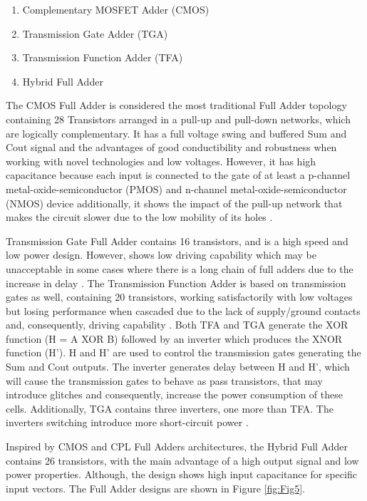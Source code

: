 \documentclass[ecp,tc, english]{iiufrgs}
\begin{document}
\begin{enumerate}
    \item Complementary MOSFET Adder (CMOS)
    \item Transmission Gate Adder (TGA)
    \item Transmission Function Adder (TFA)
    \item Hybrid Full Adder
\end{enumerate}

The CMOS Full Adder is considered the most traditional Full Adder topology containing 28 Transistors arranged in a pull-up and pull-down networks, which are logically complementary. It has a full voltage swing and buffered Sum and Cout signal and the advantages of good conductibility and robustness when working with novel technologies and low voltages. However, it has high capacitance because each input is connected to the gate of at least a p-channel metal-oxide-semiconductor (PMOS) and n-channel metal-oxide-semiconductor (NMOS) device additionally, it shows the impact of the pull-up network that makes the circuit slower due to the low mobility of its holes \cite{beckett2002fine} \cite{devadas2017design} \cite{islam2011design}. 

Transmission Gate Full Adder \cite{weste1985principles} contains 16 transistors, and is a high speed and low power design. However, shows low driving capability which may be unacceptable in some cases where there is a long chain of full adders due to the increase in delay \cite{islam2011design}. The Transmission Function Adder is based on transmission gates as well, containing 20 transistors, working satisfactorily with low voltages but losing performance when cascaded due to the lack of supply/ground contacts and, consequently, driving capability \cite{navi2009novel}. Both TFA and TGA generate the XOR function (H = A XOR B) followed by an inverter which produces the XNOR function (H’). H and H’ are used to control the transmission gates generating the Sum and Cout outputs. The inverter generates delay between H and H’, which will cause the transmission gates to behave as pass transistors, that may introduce glitches and consequently, increase the power consumption of these cells. Additionally, TGA contains three inverters, one more than TFA. The inverters switching introduce more short-circuit power \cite{shams2000novel}.

Inspired by CMOS and CPL Full Adders architectures, the Hybrid Full Adder \cite{navi2009novel} contains 26 transistors, with the main advantage of a high output signal and low power properties. Although, the design shows high input capacitance for specific input vectors. The Full Adder designs are shown in Figure \ref{fig:Fig5}.
\end{document}
